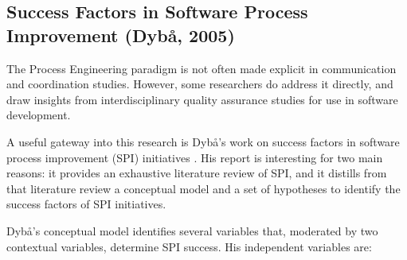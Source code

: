 \subsection{Success Factors in Software Process Improvement (Dyb\aa, 2005)}

The Process Engineering paradigm is not often made explicit in communication and coordination studies. However, some researchers do address it directly, and draw insights from interdisciplinary quality assurance studies for use in software development.

A useful gateway into this research is Dyb\aa's work on success factors in software process improvement (SPI) initiatives \cite{Dyba2005}. His report is interesting for two main reasons: it provides an exhaustive literature review of SPI, and it distills from that literature review a conceptual model and a set of hypotheses to identify the success factors of SPI initiatives.

Dyb\aa's conceptual model identifies several variables that, moderated by two contextual variables, determine SPI success. His independent variables are:

